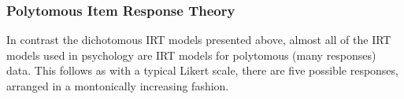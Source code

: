 \label{sec:irt-models}


\label{sec:irt-models}




\subsubsection{Polytomous Item Response Theory}
\label{sec:polyt-item-resp}
In contrast the dichotomous IRT models presented above, almost all of the IRT models used in psychology are IRT models for polytomous (many responses) data. This follows as with a typical Likert scale, there are five possible responses, arranged  in a montonically increasing fashion.

